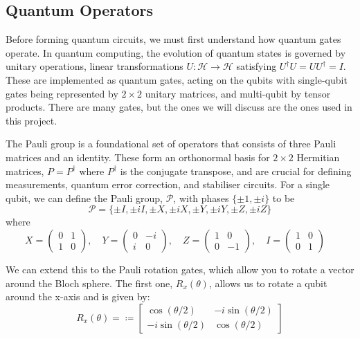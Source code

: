 \documentclass[12pt]{article}
\newcommand{\newp}
    {
    \vskip 0.5cm 
  }
\numberwithin{equation}{section}
\begin{document}
\newp
\subsection{Quantum Operators}
Before forming quantum circuits, we must first understand how quantum gates operate. 
In quantum computing, the evolution of quantum states is governed by unitary 
operations, linear transformations $U: \mathcal{H} \rightarrow \mathcal{H}$ satisfying 
$U^{\dagger}U = UU^{\dagger} = I$. These are implemented as quantum gates, acting on 
the qubits with single-qubit gates being represented by $2\times2$ unitary matrices,
and multi-qubit by tensor products. There are many gates, but the ones we will 
discuss are the ones used in this project. 
\newp
The Pauli group is a foundational set of operators that consists of three Pauli 
matrices and an identity. These form an orthonormal basis for $2\times 2$ Hermitian 
matrices, $P=P^{\dagger}$ where $P^{\dagger}$ is the conjugate transpose, and are 
crucial for defining measurements, quantum error correction, and stabiliser 
circuits. For a single qubit, we can define the Pauli group, $\mathcal{P}$, with 
phases $\{\pm1, \pm i\}$ to be 
\begin{equation}
  \mathcal{P} = \{\pm I, \pm iI, \pm X, \pm iX, \pm Y, \pm iY, \pm Z, \pm iZ\}
\end{equation}
where
\begin{equation}
X = \begin{pmatrix} 0 & 1 \\ 1 & 0 \end{pmatrix}, \quad
Y = \begin{pmatrix} 0 & -i \\ i & 0 \end{pmatrix}, \quad
Z = \begin{pmatrix} 1 & 0 \\ 0 & -1 \end{pmatrix}, \quad
I = \begin{pmatrix} 1 & 0 \\ 0 & 1 \end{pmatrix} \quad
\end{equation}
\newp 
We can extend this to the Pauli rotation gates, which 
allow you to rotate a vector around the Bloch sphere. The first one, $R_x(\theta)$,
allows us to rotate a qubit around the x-axis and is given by:
$$
R_x(\theta) = \coloneqq 
\begin{bmatrix}
\cos(\theta/2) & -i\sin(\theta/2) \\
-i\sin(\theta/2) & \cos(\theta/2)
\end{bmatrix}
$$ 
\end{document}
